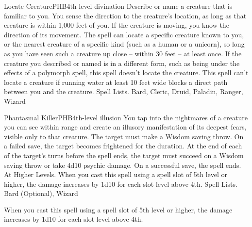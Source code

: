 \begin{spell}{Locate Creature}{PHB}{4th-level divination}
{
}
Describe or name a creature that is familiar to you. You sense the direction to the creature’s location, as long as that creature is within 1,000 feet of you. If the creature is moving, you know the direction of its movement.
The spell can locate a specific creature known to you, or the nearest creature of a specific kind (such as a human or a unicorn), so long as you have seen such a creature up close – within 30 feet – at least once. If the creature you described or named is in a different form, such as being under the effects of a polymorph spell, this spell doesn’t locate the creature.
This spell can’t locate a creature if running water at least 10 feet wide blocks a direct path between you and the creature.
Spell Lists. Bard, Cleric, Druid, Paladin, Ranger, Wizard
\end{spell}

\begin{spell}{Phantasmal Killer}{PHB}{4th-level illusion}
{
}
You tap into the nightmares of a creature you can see within range and create an illusory manifestation of its deepest fears, visible only to that creature.
The target must make a Wisdom saving throw. On a failed save, the target becomes frightened for the duration. At the end of each of the target’s turns before the spell ends, the target must succeed on a Wisdom saving throw or take 4d10 psychic damage. On a successful save, the spell ends.
At Higher Levels. When you cast this spell using a spell slot of 5th level or higher, the damage increases by 1d10 for each slot level above 4th.
Spell Lists. Bard (Optional), Wizard

 When you cast this spell using a spell slot of 5th level or higher, the damage increases by 1d10 for each slot level above 4th.
\end{spell}

